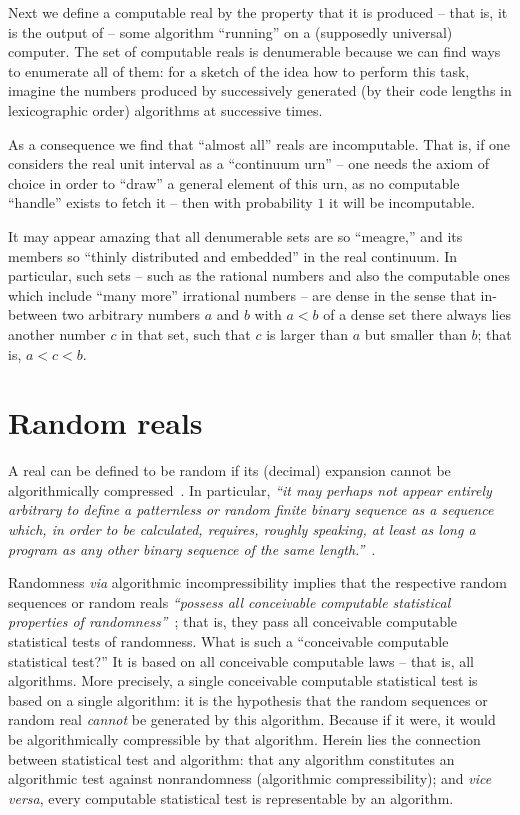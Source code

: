 Next we define a computable real by the property that it is produced -- that is, it is the output of -- some algorithm ``running'' on a (supposedly universal) computer.
The set of computable reals is denumerable because we can find ways to enumerate all of them:
for a sketch of the idea how to perform this task, imagine
the numbers produced by successively generated
(by their code lengths in lexicographic order) algorithms at successive times.

As a consequence we find that ``almost all'' reals are incomputable.
That is, if one considers the real unit interval as a ``continuum urn''
--
one needs the axiom of choice in order to ``draw'' a general element of this urn,
as no computable ``handle'' exists to fetch it
--
then with probability $1$ it will be incomputable.

It may appear amazing that all denumerable sets are so ``meagre,'' and its members so ``thinly distributed and embedded''  in the real continuum.
In particular, such sets -- such as the rational numbers and also the computable ones which include ``many more'' irrational numbers --
are dense
in the sense that in-between two arbitrary numbers $a$ and $b$ with $a < b$ of a dense set there always lies another number $c$ in that set, such that $c$ is
larger than $a$ but smaller than $b$; that is, $a < c < b$.


\section{Random reals}
\label{2016-pu-book-chapter-ranform--s-rr}

A real can be defined to be random if its (decimal) expansion cannot be algorithmically
compressed~\cite{kolmogorov1,chaitin-66c,Kolmogorov-1968,chaitin-ait-82-handbook,lambalgen-89,lambalgen4,calude:02,li-vitanyi-2008,DH}.
In particular, {\em ``it may perhaps not appear entirely arbitrary
to define a patternless or random finite binary sequence as a sequence which, in
order to be calculated, requires, roughly speaking, at least as long a program as any
other binary sequence of the same length.''}~\cite{chaitin-66c}.

Randomness {\it via} algorithmic incompressibility implies that the respective random sequences  or random reals
{\em ``possess all conceivable computable statistical properties of randomness''}~\cite{MartinLoef1966602};
that is, they pass all conceivable computable  statistical tests of randomness.
What is such a ``conceivable computable  statistical test?''
It is based on all conceivable computable laws -- that is,
all algorithms. More precisely,
a single conceivable computable  statistical test is based on a single algorithm: it is the hypothesis that the random sequences  or random real
{\em cannot} be generated by this algorithm. Because if it were, it would be algorithmically compressible by that algorithm.
Herein lies the connection between statistical test and algorithm: that any algorithm constitutes an algorithmic test against nonrandomness
(algorithmic compressibility); and {\it vice versa}, every computable statistical test is representable by an algorithm.


